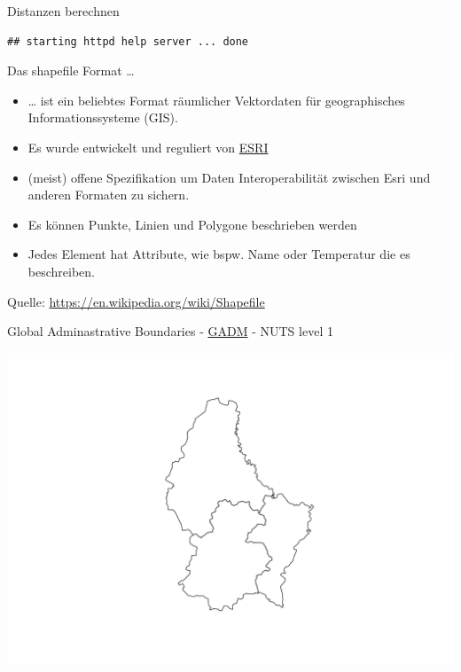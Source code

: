 \documentclass[ignorenonframetext,]{beamer}
\begin{document}
\begin{frame}[fragile]{Distanzen berechnen}
\protect\hypertarget{distanzen-berechnen}{}

\begin{verbatim}
## starting httpd help server ... done
\end{verbatim}

\end{frame}

\begin{frame}{Das shapefile Format \ldots{}}
\protect\hypertarget{das-shapefile-format}{}

\begin{itemize}
\item
  \ldots{} ist ein beliebtes Format räumlicher Vektordaten für
  geographisches Informationssysteme (GIS).
\item
  Es wurde entwickelt und reguliert von
  \href{http://www.esri.com/}{ESRI}
\item
  (meist) offene Spezifikation um Daten Interoperabilität zwischen Esri
  und anderen Formaten zu sichern.
\item
  Es können Punkte, Linien und Polygone beschrieben werden
\item
  Jedes Element hat Attribute, wie bspw. Name oder Temperatur die es
  beschreiben.
\end{itemize}

Quelle: \url{https://en.wikipedia.org/wiki/Shapefile}

\end{frame}

\begin{frame}{Global Adminastrative Boundaries -
\href{http://www.gadm.org/}{GADM} - NUTS level 1}
\protect\hypertarget{global-adminastrative-boundaries---gadm---nuts-level-1}{}

\includegraphics{Shapefiles_files/figure-beamer/unnamed-chunk-29-1.pdf}

\end{frame}
\end{document}

